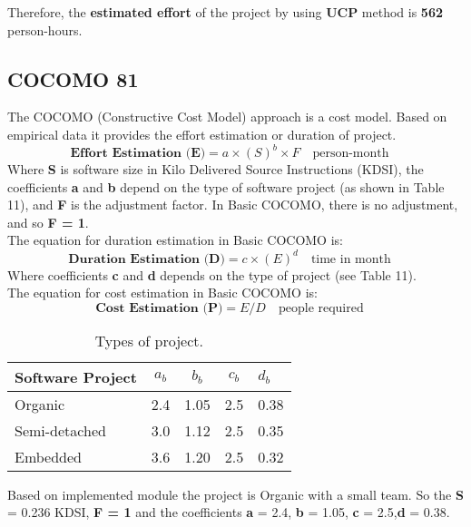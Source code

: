 \documentclass[12pt]{article}
\begin{document}
Therefore, the \textbf{estimated effort} of the project by using \textbf{UCP} method is \textbf{562} person-hours.

\subsection{COCOMO 81}
The COCOMO (Constructive Cost Model) approach is a cost model. Based on empirical data it provides the effort estimation or duration of project.
\begin{equation}
    \textbf{Effort Estimation (E)} = a\times (S)^{b}\times F \quad \textrm{person-month} \quad
\end{equation}
Where \textbf{S} is software size in Kilo Delivered Source Instructions (KDSI), the coefficients \textbf{a} and \textbf{b} depend on the type of software project (as shown in Table 11), and \textbf{F} is the adjustment factor. In Basic COCOMO, there is no adjustment, and so \textbf{F = 1}.\\

The equation for duration estimation in Basic COCOMO is:
\begin{equation}
    \textbf{Duration Estimation (D)} = c\times (E)^{d} \quad \textrm{time in month} \quad
\end{equation}
Where coefficients \textbf{c} and \textbf{d} depends on the type of project (see Table 11).\\

The equation for cost estimation in Basic COCOMO is: 
\begin{equation}
    \textbf{Cost Estimation (P)} = E/D \quad \textrm{people required} \quad
\end{equation}

\begin{table}[h]
\centering
\begin{tabular}{|l|l|l|l|l|}
\hline
\multicolumn{1}{|c|}{\textbf{Software Project}} & \multicolumn{1}{c|}{\textbf{$a_{b}$}} & \multicolumn{1}{c|}{\textbf{$b_{b}$}} & \multicolumn{1}{c|}{\textbf{$c_{b}$}} & \textbf{$d_{b}$} \\ \hline
Organic & 2.4 & 1.05 & 2.5 & 0.38 \\ \hline
Semi-detached & 3.0 & 1.12 & 2.5 & 0.35 \\ \hline
Embedded & 3.6 & 1.20 & 2.5 & 0.32 \\ \hline
\end{tabular}
\caption{Types of project.}
\end{table}
Based on implemented module the project is Organic with a small team. So the \textbf{S} = 0.236 KDSI, \textbf{F = 1} and the coefficients \textbf{a} = 2.4, \textbf{b} = 1.05, \textbf{c} = 2.5,\textbf{d} = 0.38.\\ 
\end{document}

